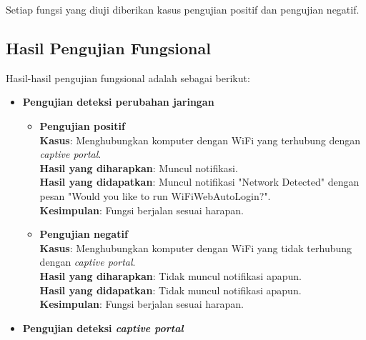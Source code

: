 Setiap fungsi yang diuji diberikan kasus pengujian positif dan pengujian negatif.

\subsection{Hasil Pengujian Fungsional}
\label{subsec:hasil_pengujian_fungsional}

Hasil-hasil pengujian fungsional adalah sebagai berikut:

\begin{itemize}
    \item{
        \textbf{Pengujian deteksi perubahan jaringan}
        
        \begin{itemize}
            \item{
                \textbf{Pengujian positif}\\
                \textbf{Kasus}: Menghubungkan komputer dengan WiFi yang terhubung dengan \textit{captive portal}.\\
                \textbf{Hasil yang diharapkan}: Muncul notifikasi.\\
                \textbf{Hasil yang didapatkan}: Muncul notifikasi "Network Detected" dengan pesan "Would you like to run WiFiWebAutoLogin?".\\
                \textbf{Kesimpulan}: Fungsi berjalan sesuai harapan.
            }
            \item{
                \textbf{Pengujian negatif}\\
                \textbf{Kasus}: Menghubungkan komputer dengan WiFi yang tidak terhubung dengan \textit{captive portal}.\\
                \textbf{Hasil yang diharapkan}: Tidak muncul notifikasi apapun.\\
                \textbf{Hasil yang didapatkan}: Tidak muncul notifikasi apapun.\\
                \textbf{Kesimpulan}: Fungsi berjalan sesuai harapan.
            }
        \end{itemize}
    }
    \item{
        \textbf{Pengujian deteksi \textit{captive portal}}
        
}
\end{itemize}
